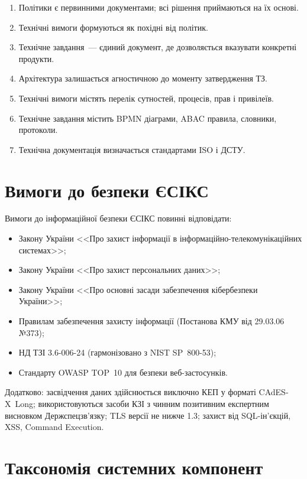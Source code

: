 \begin{enumerate}
    \item Політики є первинними документами; всі рішення приймаються на їх основі.
    \item Технічні вимоги формуються як похідні від політик.
    \item Технічне завдання~--- єдиний документ, де дозволяється вказувати конкретні продукти.
    \item Архітектура залишається агностичною до моменту затвердження ТЗ.
    \item Технічні вимоги містять перелік сутностей, процесів, прав і привілеїв.
    \item Технічне завдання містить BPMN діаграми, ABAC правила, словники, протоколи.
    \item Технічна документація визначається стандартами ISO і ДСТУ.
\end{enumerate}

\section{Вимоги до безпеки ЄСІКС}

Вимоги до інформаційної безпеки ЄСІКС повинні відповідати:

\begin{itemize}
    \item Закону України <<Про захист інформації в інформаційно-телекомунікаційних системах>>;
    \item Закону України <<Про захист персональних даних>>;
    \item Закону України <<Про основні засади забезпечення кібербезпеки України>>;
    \item Правилам забезпечення захисту інформації (Постанова КМУ від 29.03.06 №373);
    \item НД ТЗІ 3.6-006-24 (гармонізовано з NIST SP~800-53);
    \item Стандарту OWASP TOP~10 для безпеки веб-застосунків.
\end{itemize}

Додатково: засвідчення даних здійснюється виключно КЕП у форматі CAdES-X~Long;
використовуються засоби КЗІ з чинним позитивним експертним висновком Держспецзв'язку;
TLS версії не нижче 1.3; захист від SQL-ін'єкцій, XSS, Command Execution.

\section{Таксономія системних компонент}

